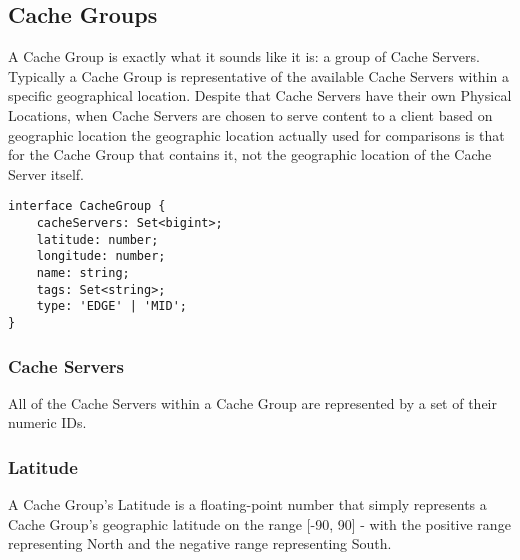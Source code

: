 %
%

\subsection{Cache Groups}
A Cache Group is exactly what it sounds like it is: a group of Cache Servers.
Typically a Cache Group is representative of the available Cache Servers within a
specific geographical location. Despite that Cache Servers have their own
Physical Locations, when Cache Servers are chosen to serve content to a client
based on geographic location the geographic location actually used for
comparisons is that for the Cache Group that contains it, not the geographic
location of the Cache Server itself.

\begin{codelisting}
\begin{verbatim}
interface CacheGroup {
	cacheServers: Set<bigint>;
	latitude: number;
	longitude: number;
	name: string;
	tags: Set<string>;
	type: 'EDGE' | 'MID';
}
\end{verbatim}
\end{codelisting}

\subsubsection{Cache Servers}
All of the Cache Servers within a Cache Group are represented by a set of their
numeric IDs.

\subsubsection{Latitude}
A Cache Group's Latitude is a floating-point number that simply represents a
Cache Group's geographic latitude on the range [-90, 90] - with the positive
range representing North and the negative range representing South.


